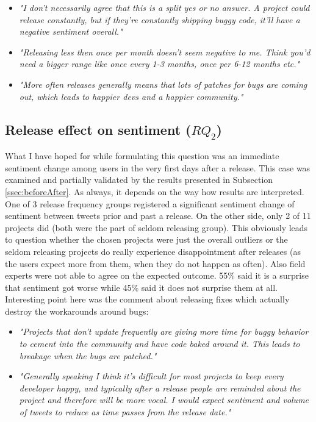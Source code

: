 \begin{itemize}
\item \textit{"I don't necessarily agree that this is a split yes or no answer. A project could release constantly, but if they're constantly shipping buggy code, it'll have a negative sentiment overall."}
\item \textit{"Releasing less then once per month doesn't seem negative to me. Think you'd need a bigger range like once every 1-3 months, once per 6-12 months etc."}
\item \textit{"More often releases generally means that lots of patches for bugs are coming out, which leads to happier devs and a happier community."}
\end{itemize}

\subsection{Release effect on sentiment ($RQ_{2}$)}
What I have hoped for while formulating this question was an immediate sentiment change among users in the very first days after a release. This case was examined and partially validated by the results presented in Subsection \ref{ssec:beforeAfter}. As always, it depends on the way how results are interpreted. One of 3 release frequency groups registered a significant sentiment change of sentiment between tweets prior and past a release. On the other side, only 2 of 11 projects did (both were the part of seldom releasing group). This obviously leads to question whether the chosen projects were just the overall outliers or the seldom releasing projects do really experience disappointment after releases (as the users expect more from them, when they do not happen as often). Also field experts were not able to agree on the expected outcome. 55\% said  it is a surprise that sentiment got worse while 45\% said it does not surprise them at all. Interesting point here was the comment about releasing fixes which actually destroy the workarounds around bugs:
\begin{itemize}
\item \textit{"Projects that don't update frequently are giving more time for buggy behavior to cement into the community and have code baked around it. This leads to breakage when the bugs are patched."}
\item \textit{"Generally speaking I think it's difficult for most projects to keep every developer happy, and typically after a release people are reminded about the project and therefore will be more vocal. I would expect sentiment and volume of tweets to reduce as time passes from the release date."}
\end{itemize}

